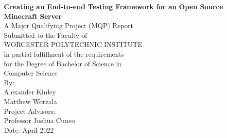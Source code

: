\documentclass{article}
\begin{document}
 



\begin{center}
    \Huge{\textbf{Creating an End-to-end Testing Framework for an Open Source Minecraft Server}} \\ %
    \vspace{10mm} %
    \large{
    A Major Qualifying Project (MQP) Report \\
    Submitted to the Faculty of \\
    WORCESTER POLYTECHNIC INSTITUTE \\
    in partial fulfillment of the requirements \\
    for the Degree of Bachelor of Science in \\
    } %
    \Large{
    \vspace{5mm} %
    Computer Science \\ %
    \vspace{10mm} %
    By: \\
    \vspace{2mm} %
    Alexander Kinley \\ %
    Matthew Worzala \\ %
    \vspace {15mm} %
    Project Advisors: \\ %
    \vspace{2mm} %
    Professor Joshua Cuneo \\ %
    \vspace {10mm} %
    Date: April 2022 \\ %
    }
    \vspace{0mm} %
    \begin{figure}[h]
    \centering

\end{figure}
\end{center}
\end{document}
